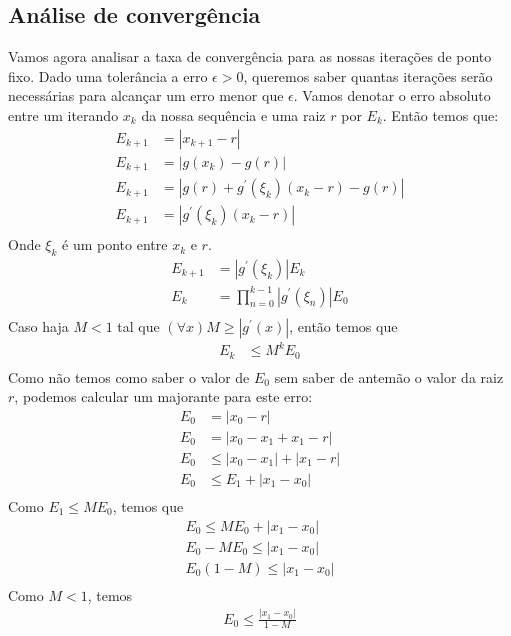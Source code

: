 \documentclass{article}
\begin{document}
  \subsection{Análise de convergência}
  Vamos agora analisar a taxa de convergência para as nossas iterações de ponto fixo. Dado uma tolerância a erro $\epsilon > 0$, queremos saber quantas iterações serão necessárias para alcançar um erro menor que $\epsilon$.
  Vamos denotar o erro absoluto entre um iterando $x_k$ da nossa sequência e uma raiz $r$ por $E_k$. Então temos que: 
  \begin{align*}
        E_{k+1} &= |x_{k+1} - r|\\
        E_{k+1} &= |g(x_k) - g(r)|\\
        E_{k+1} &= |g(r) + g^\prime(\xi_k)(x_k - r) - g(r)|\\
        E_{k+1} &= |g^\prime(\xi_k)(x_k - r)|\\
    \end{align*}
    Onde $\xi_k$ é um ponto entre $x_k$ e $r$.
    \begin{align*}
        E_{k+1} &= |g^\prime(\xi_k)|E_k\\
        E_{k} &= \prod_{n=0}^{k-1}|g^\prime(\xi_n)| E_0\\
    \end{align*}
    Caso haja $M < 1$ tal que $(\forall x) M \geq |g^\prime(x)|$, então temos que
    \begin{align*}
        E_{k} &\leq M^k E_0\\
    \end{align*}
    Como não temos como saber o valor de $E_0$ sem saber de antemão o valor da raiz $r$, podemos calcular um majorante para este erro:
    \begin{align*}
        E_0 &= |x_0 - r|\\
        E_0 &= |x_0 - x_1 + x_1 - r|\\
        E_0 &\leq |x_0 - x_1| + |x_1 - r|\\
        E_0 &\leq E_1 + |x_1 - x_0|\\
    \end{align*}
    Como $E_1 \leq M E_0$, temos que
    \begin{align*}
        E_0 \leq M E_0 + |x_1 - x_0|\\
        E_0 - M E_0 \leq |x_1 - x_0|\\
        E_0 (1 - M) \leq |x_1 - x_0|\\
    \end{align*}
    Como $M < 1$, temos
    \begin{align*}
        E_0 \leq \frac{|x_1 - x_0|}{1 - M}
    \end{align*}
\end{document}
